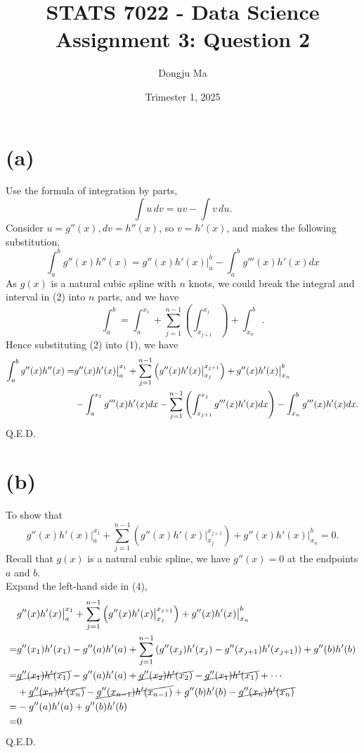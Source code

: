 \documentclass{article}
\title{STATS 7022 - Data Science Assignment 3: Question 2}
\author{Dongju Ma}
\date{Trimester 1, 2025}
\begin{document}
\maketitle

\section*{(a)}
Use the formula of integration by parts, 
\begin{equation*}
\int u \, dv = uv - \int v \, du.
\end{equation*}
Consider $u = g''(x), dv = h''(x)$, so $v = h'(x)$, and makes the following substitution,
\begin{equation}
    \int_{a}^{b} g''(x) h''(x) = g''(x)h'(x) \big|_{a}^{b} - \int_{a}^{b} g'''(x) h'(x)dx
\end{equation}
As $g(x)$ is a natural cubic spline with $n$ knots, we could break the integral and interval in (2) into $n$ parts, and we have
\begin{equation}
    \int_{a}^{b} = \int_{a}^{x_1} + \sum_{j=1}^{n - 1} \left(\int_{x_{j+1}}^{x_j} \right) + \int_{x_n}^{b}.
\end{equation}
Hence substituting (2) into (1), we have
\begin{align}
    \int_{a}^{b} g''(x) h''(x) = &g''(x)h'(x) \big|_{a}^{x_1} +
    \sum_{j=1}^{n - 1}\left(g''(x)h'(x) \big|_{x_j}^{x_{j+1}}\right) +
    g''(x)h'(x) \big|_{x_n}^{b} \notag \\
    &- 
    \int_{a}^{x_1} g'''(x)h'(x)dx -
    \sum_{j=1}^{n - 1} \left(\int_{x_{j+1}}^{x_j} g'''(x) h'(x)dx \right) -
    \int_{x_n}^{b} g'''(x)h'(x)dx.
\end{align}
Q.E.D.

\section*{(b)}
To show that
\begin{equation}
    g''(x)h'(x) \big|_{a}^{x_1} +
    \sum_{j=1}^{n - 1}\left(g''(x)h'(x) \big|_{x_j}^{x_{j+1}}\right) +
    g''(x)h'(x) \big|_{x_n}^{b} 
    = 0.
\end{equation}
Recall that $g(x)$ is a natural cubic spline, we have $g''(x) = 0$ at the endpoints $a$ and $b$. \\
Expand the left-hand side in (4),
\begin{align*}
    &g''(x)h'(x) \big|_{a}^{x_1} +\sum_{j=1}^{n - 1}\left(g''(x)h'(x) \big|_{x_j}^{x_{j+1}}\right) +g''(x)h'(x) \big|_{x_n}^{b}  \\
    = &g''(x_1)h'(x_1) - g''(a)h'(a) + \sum_{j=1}^{n - 1}\left(g''(x_j)h'(x_j) - g''(x_{j+1})h'(x_{j+1})\right) + g''(b)h'(b)  \\
    = &\cancel{g''(x_1)h'(x_1)} - g''(a)h'(a) + \cancel{g''(x_2)h'(x_2)} - \cancel{g''(x_1)h'(x_1)} + \cdots \\
    &+ \cancel{g''(x_n)h'(x_n)} -\cancel{ g''(x_{n-1})h'(x_{n-1})} + g''(b)h'(b)  - \cancel{g''(x_n)h'(x_n)} \\
    = &- g''(a)h'(a) + g''(b)h'(b) \\
    = &0
\end{align*}
Q.E.D.
\end{document}
